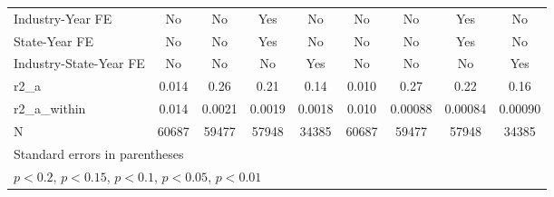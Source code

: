 {\begin{tabular}{l*{8}{c}}
\addlinespace
Industry-Year FE    &          No         &          No         &         Yes         &          No         &          No         &          No         &         Yes         &          No         \\
\addlinespace
State-Year FE       &          No         &          No         &         Yes         &          No         &          No         &          No         &         Yes         &          No         \\
\addlinespace
Industry-State-Year FE&          No         &          No         &          No         &         Yes         &          No         &          No         &          No         &         Yes         \\
\midrule
r2\_a                &       0.014         &        0.26         &        0.21         &        0.14         &       0.010         &        0.27         &        0.22         &        0.16         \\
r2\_a\_within         &       0.014         &      0.0021         &      0.0019         &      0.0018         &       0.010         &     0.00088         &     0.00084         &     0.00090         \\
N                   &       60687         &       59477         &       57948         &       34385         &       60687         &       59477         &       57948         &       34385         \\
\bottomrule
\multicolumn{9}{l}{\footnotesize Standard errors in parentheses}\\
\multicolumn{9}{l}{\footnotesize \sym{++} \(p<0.2\), \sym{+} \(p<0.15\), \sym{*} \(p<0.1\), \sym{**} \(p<0.05\), \sym{***} \(p<0.01\)}\\
\end{tabular}
}

